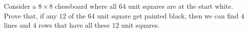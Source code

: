 Consider a $8\times 8$ chessboard where all $64$ unit squares are at the start white. Prove that, if any $12$ of the $64$ unit square get painted black, then we can find $4$ lines and $4$ rows that have all these $12$ unit squares.